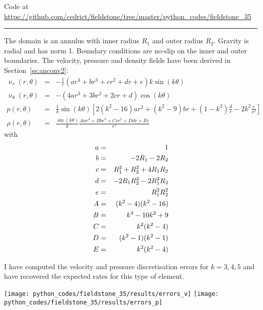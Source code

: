 

\begin{center}
Code at \url{https://github.com/cedrict/fieldstone/tree/master/python_codes/fieldstone_35}
\end{center}

\par\noindent\rule{\textwidth}{0.4pt}

The domain is an annulus with inner radius $R_1$ and outer radius $R_2$. Gravity is radial 
and has norm 1. 
Boundary conditions are no-slip on the inner and outer boundaries.
The velocity, pressure and density fields have been derived in Section~\ref{ss:anconv2}:
\begin{eqnarray}
\upnu_r (r,\theta)&=& -\frac{1}{r} (
{ ar^4}
+{ br^3}
+{c r^2}
+ {dr}
+{e}
)k\sin(k\theta)\\
\upnu_\theta(r,\theta)&=& -(4ar^3+3br^2 +2cr + d ) \cos(k\theta) \\
p(r,\theta) &= &
\frac{1}{k}\sin(k\theta) 
\left[
2(k^2-16)ar^2
+(k^2-9)br
+(1-k^2)\frac{d}{r}
-2k^2\frac{e}{r^2}
\right] \\
\rho(r,\theta)&=&\frac{\sin(k\theta)}{k}
\frac{
A{ ar^4}+
B{ br^3}+
C{c r^2} +
D {dr}+
E{e}
}{r^3}
\end{eqnarray}
with
\begin{eqnarray}
a &=& 1  \nonumber\\
b &=& -2R_1-2R_2 \nonumber\\
c &=& R_1^2+R_2^2+4R_1R_2 \nonumber\\
d &=& -2R_1R_2^2-2R_1^2R_2 \nonumber\\
e &=& R_1^2R_2^2 \nonumber\\
A &=& (k^2-4)(k^2-16)\nonumber \\
B &=& k^4-10k^2+9\nonumber    \\
C &=& k^2(k^2-4)  \nonumber    \\
D &=& (k^2-1)(k^2-1) \nonumber     \\
E &=& k^2(k^2-4) \nonumber
\end{eqnarray}

I have computed the velocity and pressure discretisation errors for $k=3,4,5$ and 
have recovered the expected rates for this type of element.

\begin{center}
\texttt{[image: python\_codes/fieldstone\_35/results/errors\_v]}
\texttt{[image: python\_codes/fieldstone\_35/results/errors\_p]}
\end{center}

